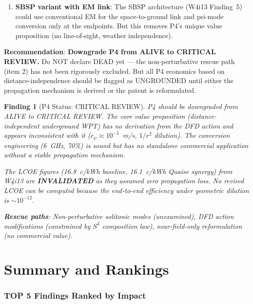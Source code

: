 \documentclass[11pt]{article}
\newtheorem{finding}{Finding}
\begin{document}
\begin{tcolorbox}[colback=yellow!5!white, colframe=yellow!60!black,
  title=\textbf{P4 STATUS ASSESSMENT}]
\begin{enumerate}
\item \textbf{SBSP variant with EM link}: The SBSP architecture
  (W4i13 Finding~5) could use conventional EM for the space-to-ground
  link and psi-mode conversion only at the endpoints. But this removes
  P4's unique value proposition (no line-of-sight, weather independence).
\end{enumerate}

\textbf{Recommendation}: \textbf{Downgrade P4 from ALIVE to
CRITICAL REVIEW.} Do NOT declare DEAD yet --- the non-perturbative
rescue path (item 2) has not been rigorously excluded. But all P4
economics based on distance-independence should be flagged as
UNGROUNDED until either the propagation mechanism is derived or the
patent is reformulated.
\end{tcolorbox}

\begin{finding}[P4 Status: CRITICAL REVIEW]
\label{find:status}
P4 should be downgraded from ALIVE to CRITICAL REVIEW. The core value
proposition (distance-independent underground WPT) has no derivation
from the DFD action and appears inconsistent with it ($c_\psi \approx
10^{-5}$~m/s, $1/r^2$ dilution). The conversion engineering (6~GHz,
70\%) is sound but has no standalone commercial application without a
viable propagation mechanism.

The LCOE figures (16.8~c/kWh baseline, 16.1~c/kWh Quaise synergy)
from W4i13 are \textbf{INVALIDATED} as they assumed zero propagation
loss. No revised LCOE can be computed because the end-to-end efficiency
under geometric dilution is $\sim 10^{-12}$.

\textbf{Rescue paths}: Non-perturbative solitonic modes (unexamined),
DFD action modifications (constrained by $S^3$ composition law),
near-field-only reformulation (no commercial value).
\end{finding}

\part{Summary and Rankings}
\label{part:summary}

\section{TOP 5 Findings Ranked by Impact}
\end{document}
